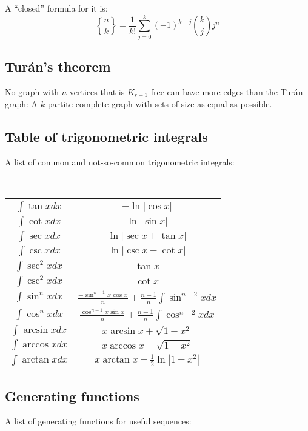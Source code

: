 \documentclass[a4paper]{amsart}
\newcommand{\stirlingsecond}[2]{\genfrac{\{}{\}}{0pt}{}{#1}{#2}}
\begin{document}
\begin{multicols}{2}
      A ``closed'' formula for it is:
      \begin{equation*}
        \stirlingsecond{n}{k} = \frac{1}{k!}\sum_{j=0}^k (-1)^{k-j} \binom{k}{j} j^n
      \end{equation*}

    \subsection{Turán's theorem} No graph with $n$ vertices that is $K_{r+1}$-free can have more edges than the Turán graph: A $k$-partite complete graph with sets of size as equal as possible.

    \subsection{Table of trigonometric integrals}
      A list of common and not-so-common trigonometric integrals:

      \ 

      \begin{tabular}{|c|c|}
        \hline 
        $\int \tan x dx$ & $-\ln |\cos x|$ \\ \hline
        $\int \cot x dx$ & $\ln |\sin x|$ \\ \hline
        $\int \sec x dx$ & $\ln |\sec x + \tan x|$ \\ \hline
        $\int \csc x dx$ & $\ln |\csc x - \cot x|$ \\ \hline
        $\int \sec^2 x dx$ & $\tan x$ \\ \hline
        $\int \csc^2 x dx$ & $\cot x$ \\ \hline
        $\int \sin^n x dx$ & $\frac{-\sin^{n-1} x \cos x}{n} + \frac{n-1}{n}\int \sin^{n-2}x dx$ \\ \hline
        $\int \cos^n x dx$ & $\frac{\cos^{n-1} x \sin x}{n} + \frac{n-1}{n}\int \cos^{n-2}x dx$ \\ \hline        
        $\int \arcsin x dx$ & $x \arcsin x + \sqrt{1 - x^2}$ \\ \hline
        $\int \arccos x dx$ & $x \arccos x - \sqrt{1 - x^2}$ \\ \hline
        $\int \arctan x dx$ & $x \arctan x - \frac{1}{2} \ln |1 - x^2|$ \\ \hline
      \end{tabular}

    \subsection{Generating functions}
      A list of generating functions for useful sequences:


\end{multicols}
\end{document}

